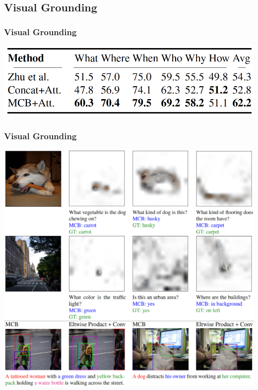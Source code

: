 \documentclass{beamer}
\begin{document}

\subsection{Visual Grounding}
\begin{frame}
\frametitle{Visual Grounding}
\begin{center}
\includegraphics[scale=0.5]{./images/VG_Result01}
\end{center}
\end{frame}
\begin{frame}
\frametitle{Visual Grounding}
\begin{center}
\includegraphics[scale=0.27]{./images/VG_Result02}
\end{center}
\end{frame}

\end{document}
